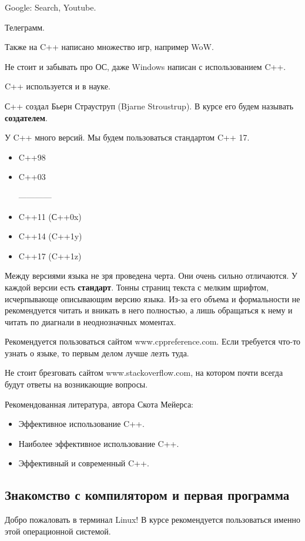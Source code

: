 Google: Search, Youtube.

Телеграмм.

Также на C++ написано множество игр, например WoW.

Не стоит и забывать про ОС, даже Windows написан с использованием C++.

C++ используется и в науке.


С++ создал Бьерн Страуструп (Bjarne Stroustrup).
В курсе его будем называть \textbf{создателем}.

У C++ много версий. Мы будем пользоваться стандартом C++ 17.

\begin{itemize}
    \item C++98
    \item C++03

    ------------

    \item C++11 (С++0x)
    \item C++14 (C++1y)
    \item C++17 (C++1z)
\end{itemize}

Между версиями языка не зря проведена черта. Они очень сильно отличаются.
У каждой версии есть \textbf{стандарт}. Тонны страниц текста с мелким шрифтом, исчерпывающе описывающим версию языка.
Из-за его объема и формальности не рекомендуется читать и вникать в него полностью, а лишь обращаться к нему и читать по диагнали в неоднозначных моментах.

Рекомендуется пользоваться сайтом www.cppreference.com.
Если требуется что-то узнать о языке, то первым делом лучше лезть туда.

Не стоит брезговать сайтом www.stackoverflow.com, на котором почти всегда будут ответы на возникающие вопросы.

Рекомендованная литература, автора Скота Мейерса:
\begin{itemize}
    \item Эффективное использование C++.
    \item Наиболее эффективное использование C++.
    \item Эффективный и современный C++.
\end{itemize}

\subsection{Знакомство с компилятором и первая программа}
Добро пожаловать в терминал Linux!
В курсе рекомендуется пользоваться именно этой операционной системой.

